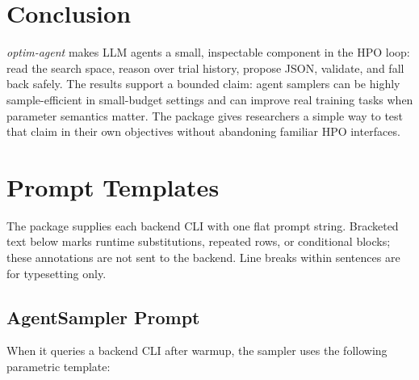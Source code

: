 \documentclass[letterpaper]{article}
\begin{document}
\section{Conclusion}

\emph{optim-agent} makes LLM agents a small, inspectable component in the HPO
loop: read the search space, reason over trial history, propose JSON, validate,
and fall back safely. The results support a bounded claim: agent samplers can be
highly sample-efficient in small-budget settings and can improve real training
tasks when parameter semantics matter. The package gives researchers a simple
way to test that claim in their own objectives without abandoning familiar HPO
interfaces.



\appendix
\setcounter{secnumdepth}{2}
\section{Prompt Templates}
\label{app:prompts}

The package supplies each backend CLI with one flat prompt string. Bracketed
text below marks runtime substitutions, repeated rows, or conditional blocks;
these annotations are not sent to the backend. Line breaks within sentences
are for typesetting only.

\subsection{AgentSampler Prompt}

When it queries a backend CLI after warmup, the sampler uses the following
parametric template:
\end{document}

